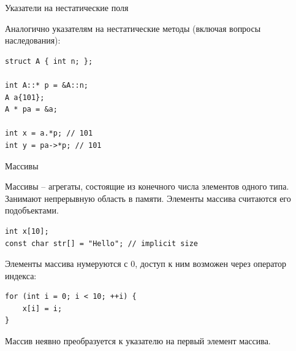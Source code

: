 \documentclass[unknownkeysallowed,xcolor=table]{beamer}
\begin{document}
\begin{frame}[fragile]{Указатели на нестатические поля}

Аналогично указателям на нестатические методы (включая вопросы наследования):

\vspace{0.7em}

\begin{lstlisting}
struct A { int n; };

int A::* p = &A::n;
A a{101};
A * pa = &a;

int x = a.*p; // 101
int y = pa->*p; // 101
\end{lstlisting}

\end{frame}

\begin{frame}[fragile]{Массивы}

Массивы -- агрегаты, состоящие из конечного числа элементов одного типа.
Занимают непрерывную область в памяти.
Элементы массива считаются его подобъектами.

\vspace{0.5em}

\begin{lstlisting}
int x[10];
const char str[] = "Hello"; // implicit size
\end{lstlisting}

\vspace{1em}

Элементы массива нумеруются с 0, доступ к ним возможен через оператор индекса:

\vspace{0.5em}

\begin{lstlisting}
for (int i = 0; i < 10; ++i) {
    x[i] = i;
}
\end{lstlisting}

\vspace{0.5em}

Массив неявно преобразуется к указателю на первый элемент массива.

\end{frame}
\end{document}
